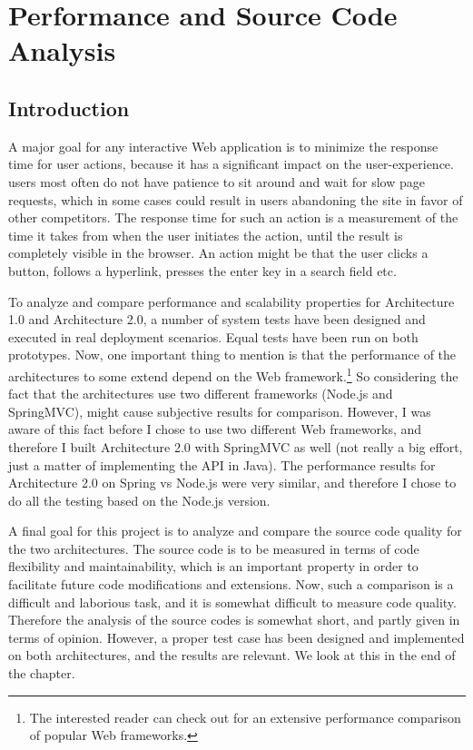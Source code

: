 \chapter{Performance and Source Code Analysis}
\section{Introduction}
A major goal for any interactive Web application is to minimize the response time for user actions, because it has a significant impact on the user-experience. users most often do not have patience to sit around and wait for slow page requests, which in some cases could result in users abandoning the site in favor of other competitors.  The response time for such an action is a measurement of the time it takes from when the user initiates the action, until the result is completely visible in the browser. An action might be that the user clicks a button, follows a hyperlink, presses the enter key in a search field etc. 

To analyze and compare performance and scalability properties for Architecture 1.0 and Architecture 2.0, a number of system tests have been designed and executed in real deployment scenarios. Equal tests have been run on both prototypes. Now, one important thing to mention is that the performance of the architectures to some extend depend on the Web framework.\footnote{The interested reader can check out\cite{frameworkbench} for an extensive performance comparison of popular Web frameworks.} So considering the fact that the architectures use two different frameworks (Node.js and SpringMVC), might cause subjective results for comparison. However, I was aware of this fact before I chose to use two different Web frameworks, and therefore I  built Architecture 2.0 with SpringMVC as well (not really a big effort, just a matter of implementing the API in Java). The performance results for Architecture 2.0 on Spring vs Node.js were very similar, and therefore I chose to do all the testing based on the Node.js version. 

A final goal for this project is to analyze and compare the source code quality for the two architectures. The source code is to be measured in terms of code flexibility and maintainability, which is an important property in order to facilitate future code modifications and extensions. Now, such a comparison is a difficult and laborious task, and it is somewhat difficult to measure code quality. Therefore the analysis of the source codes is somewhat short, and partly given in terms of opinion. However, a proper test case has been designed and implemented on both architectures, and the results are relevant. We look at this in the end of the chapter.

